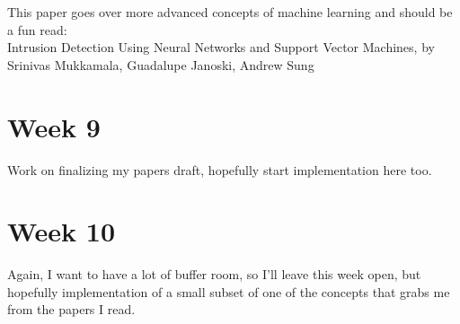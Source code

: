 \documentclass{article}
\begin{document}
This paper goes over more advanced concepts of machine learning and should be a fun read:\\
Intrusion Detection Using Neural Networks and Support Vector Machines, by Srinivas Mukkamala, Guadalupe Janoski, Andrew Sung\\

\section*{Week 9}
Work on finalizing my papers draft, hopefully start implementation here too.\\

\section*{Week 10}
Again, I want to have a lot of buffer room, so I'll leave this week open, but hopefully implementation of a small subset of one of the concepts that grabs me from the papers I read.\\
\end{document}
